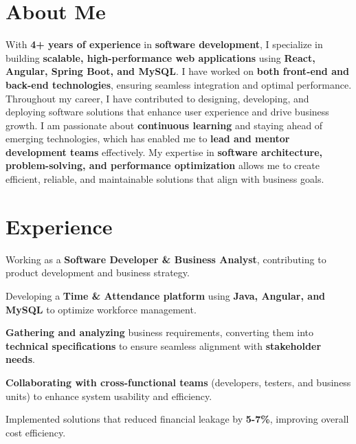 \documentclass[]{sameer-resume-openfont}
\begin{document}
\hfill
\begin{minipage}[t]{0.66\textwidth} 


\section{About Me}
With \textbf{4+ years of experience} in \textbf{software development}, I specialize in building \textbf{scalable, high-performance web applications} using \textbf{React, Angular, Spring Boot, and MySQL}. I have worked on \textbf{both front-end and back-end technologies}, ensuring seamless integration and optimal performance. Throughout my career, I have contributed to designing, developing, and deploying software solutions that enhance user experience and drive business growth.  
\vspace{1\baselineskip}
I am passionate about \textbf{continuous learning} and staying ahead of emerging technologies, which has enabled me to \textbf{lead and mentor development teams} effectively. My expertise in \textbf{software architecture, problem-solving, and performance optimization} allows me to create efficient, reliable, and maintainable solutions that align with business goals.

\sectionsep
\section{Experience}

\vspace{\topsep} 
\begin{tightemize}
\item Working as a \textbf{Software Developer \& Business Analyst}, contributing to product development and business strategy.
\item Developing a \textbf{Time \& Attendance platform} using \textbf{Java, Angular, and MySQL} to optimize workforce management.
\item \textbf{Gathering and analyzing} business requirements, converting them into \textbf{technical specifications} to ensure seamless alignment with \textbf{stakeholder needs}.
\item \textbf{Collaborating with cross-functional teams} (developers, testers, and business units) to enhance system usability and efficiency.
\item Implemented solutions that reduced financial leakage by \textbf{5-7\%}, improving overall cost efficiency.
\end{tightemize}
\sectionsep


\end{minipage}
\end{document}
